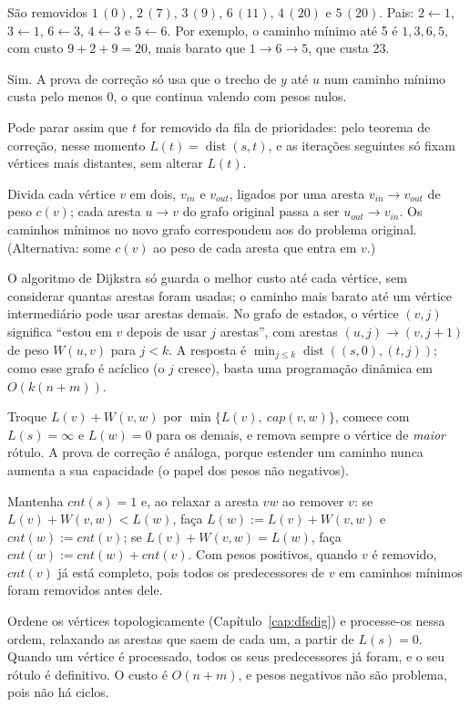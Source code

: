  São removidos $1\,(0)$, $2\,(7)$, $3\,(9)$, $6\,(11)$, $4\,(20)$ e $5\,(20)$. Pais: $2\leftarrow1$, $3\leftarrow1$, $6\leftarrow3$, $4\leftarrow3$ e $5\leftarrow6$. Por exemplo, o caminho mínimo até 5 é $1,3,6,5$, com custo $9+2+9=20$, mais barato que $1\to6\to5$, que custa 23.

 Sim. A prova de correção só usa que o trecho de $y$ até $u$ num caminho mínimo custa pelo menos 0, o que continua valendo com pesos nulos.

 Pode parar assim que $t$ for removido da fila de prioridades: pelo teorema de correção, nesse momento $L(t)=\operatorname{dist}(s,t)$, e as iterações seguintes só fixam vértices mais distantes, sem alterar $L(t)$.

 Divida cada vértice $v$ em dois, $v_{in}$ e $v_{out}$, ligados por uma aresta $v_{in}\to v_{out}$ de peso $c(v)$; cada aresta $u\to v$ do grafo original passa a ser $u_{out}\to v_{in}$. Os caminhos mínimos no novo grafo correspondem aos do problema original. (Alternativa: some $c(v)$ ao peso de cada aresta que entra em $v$.)

 O algoritmo de Dijkstra só guarda o melhor custo até cada vértice, sem considerar quantas arestas foram usadas; o caminho mais barato até um vértice intermediário pode usar arestas demais. No grafo de estados, o vértice $(v,j)$ significa ``estou em $v$ depois de usar $j$ arestas'', com arestas $(u,j)\to(v,j+1)$ de peso $W(u,v)$ para $j<k$. A resposta é $\min_{j\le k}\operatorname{dist}((s,0),(t,j))$; como esse grafo é acíclico (o $j$ cresce), basta uma programação dinâmica em $O(k(n+m))$.

 Troque $L(v)+W(v,w)$ por $\min\{L(v),\ cap(v,w)\}$, comece com $L(s)=\infty$ e $L(w)=0$ para os demais, e remova sempre o vértice de \emph{maior} rótulo. A prova de correção é análoga, porque estender um caminho nunca aumenta a sua capacidade (o papel dos pesos não negativos).

 Mantenha $cnt(s)=1$ e, ao relaxar a aresta $vw$ ao remover $v$: se $L(v)+W(v,w)<L(w)$, faça $L(w):=L(v)+W(v,w)$ e $cnt(w):=cnt(v)$; se $L(v)+W(v,w)=L(w)$, faça $cnt(w):=cnt(w)+cnt(v)$. Com pesos positivos, quando $v$ é removido, $cnt(v)$ já está completo, pois todos os predecessores de $v$ em caminhos mínimos foram removidos antes dele.

 Ordene os vértices topologicamente (Capítulo~\ref{cap:dfsdig}) e processe-os nessa ordem, relaxando as arestas que saem de cada um, a partir de $L(s)=0$. Quando um vértice é processado, todos os seus predecessores já foram, e o seu rótulo é definitivo. O custo é $O(n+m)$, e pesos negativos não são problema, pois não há ciclos.


